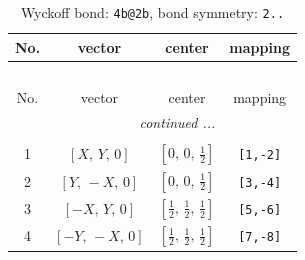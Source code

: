 \documentclass[fleqn,8pt]{jsarticle}
\begin{document}
\renewcommand{\arraystretch}{1.2}
\begin{longtable}{cccc}
\caption{Wyckoff bond: {\tt 4b@2b}, bond symmetry: {\tt 2..}}
 \\
 \hline \hline
No. & vector & center & mapping \\ \hline \endfirsthead

\multicolumn{3}{l}{\tablename\ \thetable{}} \\
 \hline \hline
No. & vector & center & mapping \\ \hline \endhead

 \hline \hline
\multicolumn{3}{r}{\footnotesize\it continued ...} \\ \endfoot

 \hline \hline
\multicolumn{3}{r}{} \\ \endlastfoot

1 & $\left[ X,\, Y,\, 0 \right]$ & $\left[ 0,\, 0,\, \frac{1}{2} \right]$ & {\tt [1,-2]} \\ \hline
2 & $\left[ Y,\, - X,\, 0 \right]$ & $\left[ 0,\, 0,\, \frac{1}{2} \right]$ & {\tt [3,-4]} \\ \hline
3 & $\left[ - X,\, Y,\, 0 \right]$ & $\left[ \frac{1}{2},\, \frac{1}{2},\, \frac{1}{2} \right]$ & {\tt [5,-6]} \\ \hline
4 & $\left[ - Y,\, - X,\, 0 \right]$ & $\left[ \frac{1}{2},\, \frac{1}{2},\, \frac{1}{2} \right]$ & {\tt [7,-8]} \\
\end{longtable}
\renewcommand{\arraystretch}{1.2}
\end{document}
